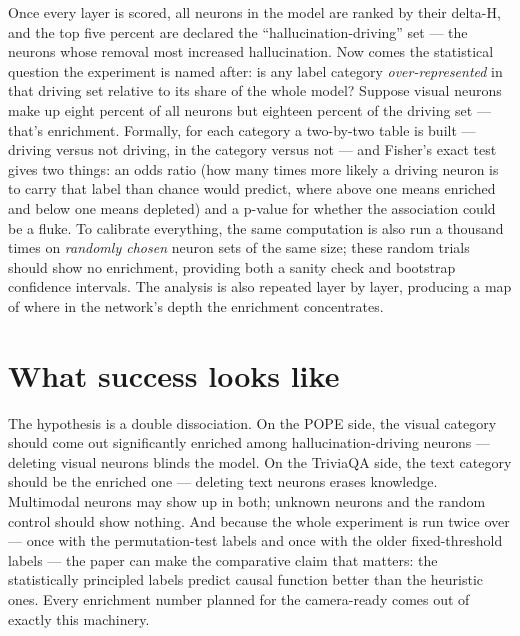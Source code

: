 \documentclass[11pt,a4paper]{article}
\begin{document}
Once every layer is scored, all neurons in the model are ranked by their delta-H,
and the top five percent are declared the ``hallucination-driving'' set --- the
neurons whose removal most increased hallucination. Now comes the statistical
question the experiment is named after: is any label category
\emph{over-represented} in that driving set relative to its share of the whole
model? Suppose visual neurons make up eight percent of all neurons but eighteen
percent of the driving set --- that's enrichment. Formally, for each category a
two-by-two table is built --- driving versus not driving, in the category versus not
--- and Fisher's exact test gives two things: an odds ratio (how many times more
likely a driving neuron is to carry that label than chance would predict, where
above one means enriched and below one means depleted) and a p-value for whether the
association could be a fluke. To calibrate everything, the same computation is also
run a thousand times on \emph{randomly chosen} neuron sets of the same size; these
random trials should show no enrichment, providing both a sanity check and bootstrap
confidence intervals. The analysis is also repeated layer by layer, producing a map
of where in the network's depth the enrichment concentrates.

\section*{What success looks like}

The hypothesis is a double dissociation. On the POPE side, the visual category
should come out significantly enriched among hallucination-driving neurons ---
deleting visual neurons blinds the model. On the TriviaQA side, the text category
should be the enriched one --- deleting text neurons erases knowledge. Multimodal
neurons may show up in both; unknown neurons and the random control should show
nothing. And because the whole experiment is run twice over --- once with the
permutation-test labels and once with the older fixed-threshold labels --- the paper
can make the comparative claim that matters: the statistically principled labels
predict causal function better than the heuristic ones. Every enrichment number
planned for the camera-ready comes out of exactly this machinery.
\end{document}
